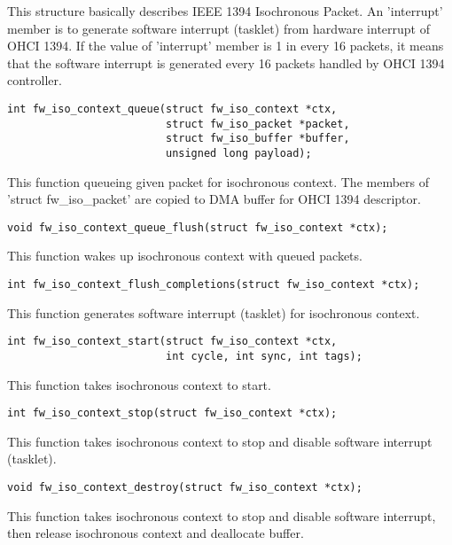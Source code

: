 \documentclass[onecolumn]{article}
\begin{document}
This structure basically describes IEEE 1394 Isochronous Packet. An 'interrupt' member is to generate software interrupt (tasklet) from hardware interrupt of OHCI 1394. If the value of 'interrupt' member is 1 in every 16 packets, it means that the software interrupt is generated every 16 packets handled by OHCI 1394 controller.

\begin{verbatim}
int fw_iso_context_queue(struct fw_iso_context *ctx,
                         struct fw_iso_packet *packet,
                         struct fw_iso_buffer *buffer,
                         unsigned long payload);
\end{verbatim}

This function queueing given packet for isochronous context. The members of 'struct fw\_iso\_packet' are copied to DMA buffer for OHCI 1394 descriptor.

\begin{verbatim}
void fw_iso_context_queue_flush(struct fw_iso_context *ctx);
\end{verbatim}

This function wakes up isochronous context with queued packets.

\begin{verbatim}
int fw_iso_context_flush_completions(struct fw_iso_context *ctx);
\end{verbatim}

This function generates software interrupt (tasklet) for isochronous context.

\begin{verbatim}
int fw_iso_context_start(struct fw_iso_context *ctx,
                         int cycle, int sync, int tags);
\end{verbatim}

This function takes isochronous context to start.

\begin{verbatim}
int fw_iso_context_stop(struct fw_iso_context *ctx);
\end{verbatim}

This function takes isochronous context to stop and disable software interrupt (tasklet).

\begin{verbatim}
void fw_iso_context_destroy(struct fw_iso_context *ctx);
\end{verbatim}

This function takes isochronous context to stop and disable software interrupt, then release isochronous context and deallocate buffer.
\end{document}
